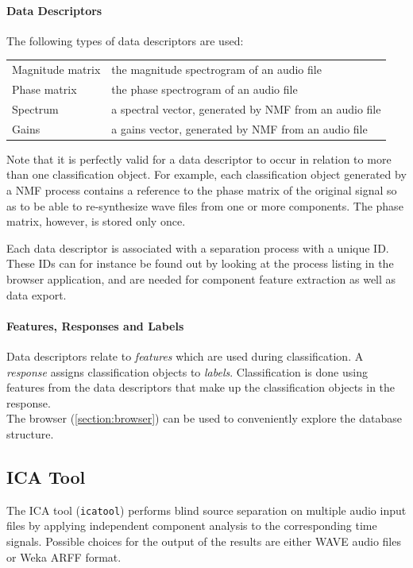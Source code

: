 \paragraph{Data Descriptors} The following types of data descriptors are used:
\begin{center}
  \begin{tabular}{|p{}|p{}|}
    \hline
    Magnitude matrix & the magnitude spectrogram of an audio file \\
    Phase matrix & the phase spectrogram of an audio file \\
    Spectrum & a spectral vector, generated by NMF from an audio file \\
    Gains & a gains vector, generated by NMF from an audio file \\
    \hline
  \end{tabular}
\end{center}
Note that it is perfectly valid for a data descriptor to occur in relation to
more than one classification object. For example, each classification object
generated by a NMF process contains a reference to the phase matrix of the
original signal so as to be able to re-synthesize wave files from one or more
components. The phase matrix, however, is stored only once.

Each data descriptor is associated with a separation process with a unique ID.
These IDs can for instance be found out by looking at the process listing in
the browser application, and are needed for component feature extraction
as well as data export.

\paragraph{Features, Responses and Labels} Data descriptors relate to
\emph{features} which are used during classification. A \emph{response} assigns
classification objects to \emph{labels}. Classification is done using features
from the data descriptors that make up the classification objects in the
response.\\

\noindent The browser (\ref{section:browser}) can be used to conveniently
explore the database structure.


\subsection{ICA Tool}

The ICA tool (\verb!icatool!) performs blind source separation on multiple audio
input files by applying independent component analysis to the corresponding time
signals. Possible choices for the output of the results are either WAVE audio
files or Weka ARFF format.


